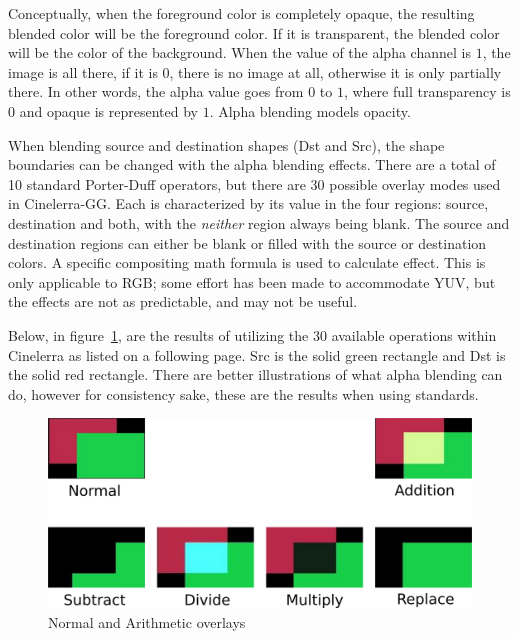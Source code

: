 Conceptually, when the foreground color is completely opaque, the resulting blended color will be the foreground color.  If it is transparent, the blended color will be the color of the background.  When the value of the alpha channel is $1$, the image is all there, if it is $0$, there is no image at all, otherwise it is only partially there.  In other words, the alpha value goes from $0$ to $1$, where full transparency is $0$ and opaque is represented by $1$.  Alpha blending models opacity. 

When blending source and destination shapes (Dst and Src), the shape boundaries can be changed with the alpha blending effects.  There are a total of 10 standard Porter-Duff operators, but there are 30 possible overlay modes used in Cinelerra-GG.  Each is characterized by its value in the four regions: source, destination and both, with the \textit{neither} region always being blank.  The source and destination regions can either be blank or filled with the source or destination colors.  A specific compositing math formula is used to calculate effect.  This is only applicable to RGB; some effort has been made to accommodate YUV, but the effects are not as predictable, and may not be useful. 

Below, in figure~\ref{fig:normal}, are the results of utilizing the 30 available operations within Cinelerra as listed on a following page.  Src is the solid green rectangle and Dst is the solid red rectangle.  There are better illustrations of what alpha blending can do, however for consistency sake, these are the results when using standards.

\begin{figure}[htpb]
    \centering
    \includegraphics[width=0.84\linewidth]{images/normal.png}
    \caption{Normal and Arithmetic overlays}
    \label{fig:normal}
\end{figure}

